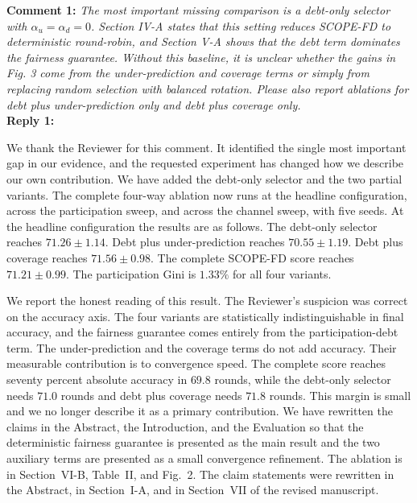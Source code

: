 \documentclass[10pt]{article}
\begin{document}
\noindent
\textbf{Comment 1:} \textit{The most important missing comparison is a debt-only selector with $\alpha_u = \alpha_d = 0$. Section IV-A states that this setting reduces SCOPE-FD to deterministic round-robin, and Section V-A shows that the debt term dominates the fairness guarantee. Without this baseline, it is unclear whether the gains in Fig. 3 come from the under-prediction and coverage terms or simply from replacing random selection with balanced rotation. Please also report ablations for debt plus under-prediction only and debt plus coverage only.} \\
\noindent
\textbf{Reply 1:} {We thank the Reviewer for this comment. It identified the single most important gap in our evidence, and the requested experiment has changed how we describe our own contribution. We have added the debt-only selector and the two partial variants. The complete four-way ablation now runs at the headline configuration, across the participation sweep, and across the channel sweep, with five seeds. At the headline configuration the results are as follows. The debt-only selector reaches $71.26 \pm 1.14$. Debt plus under-prediction reaches $70.55 \pm 1.19$. Debt plus coverage reaches $71.56 \pm 0.98$. The complete SCOPE-FD score reaches $71.21 \pm 0.99$. The participation Gini is $1.33\%$ for all four variants.

We report the honest reading of this result. The Reviewer's suspicion was correct on the accuracy axis. The four variants are statistically indistinguishable in final accuracy, and the fairness guarantee comes entirely from the participation-debt term. The under-prediction and the coverage terms do not add accuracy. Their measurable contribution is to convergence speed. The complete score reaches seventy percent absolute accuracy in $69.8$ rounds, while the debt-only selector needs $71.0$ rounds and debt plus coverage needs $71.8$ rounds. This margin is small and we no longer describe it as a primary contribution. We have rewritten the claims in the Abstract, the Introduction, and the Evaluation so that the deterministic fairness guarantee is presented as the main result and the two auxiliary terms are presented as a small convergence refinement. The ablation is in Section~VI-B, Table~II, and Fig.~2. The claim statements were rewritten in the Abstract, in Section~I-A, and in Section~VII of the revised manuscript.}\\
\end{document}
